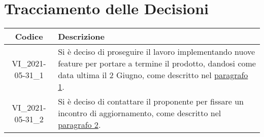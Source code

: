 \section*{Tracciamento delle Decisioni}

\begin{center}
	\begin{longtable}{|c|p{13cm}|}
	\hline
	\rowcolor{lighter-grayer}
	\textbf{Codice} & \textbf{Descrizione} \\
	\hline
	\endfirsthead

	
	
	VI\_2021-05-31\_1 & Si è deciso di proseguire il lavoro implementando nuove feature per portare a termine il prodotto, dandosi come data ultima il 2 Giugno, come descritto nel \hyperlink{link1}{paragrafo 1}.  \\
	\hline
	VI\_2021-05-31\_2 & Si è deciso di contattare il proponente per fissare un incontro di aggiornamento, come descritto nel \hyperlink{link2}{paragrafo 2}. \\
	\hline

	

	\end{longtable}
\end{center}

